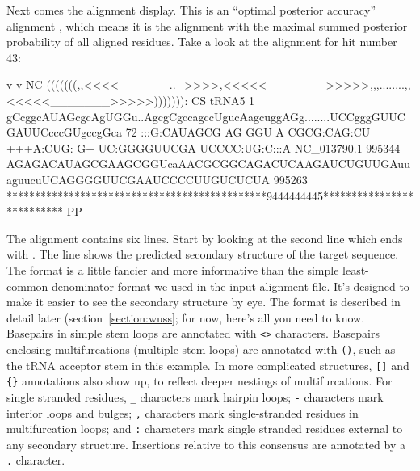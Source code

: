 Next comes the alignment display. This is an ``optimal
posterior accuracy'' alignment \cite{Holmes98}, which means it is the
alignment with the maximal summed posterior probability of all
aligned residues. Take a look at the alignment for hit number 43:

\begin{sreoutput}

                                 v         v                                                            NC
                     (((((((,,<<<<______.._>>>>,<<<<<_______>>>>>,,,........,,<<<<<_______>>>>>))))))): CS
        tRNA5      1 gCcggcAUAGcgcAgUGGu..AgcgCgccagccUgucAagcuggAGg........UCCgggGUUCGAUUCcccGUgccgGca 72    
                     :::G:CAUAGCG AG GGU  A CGCG:CAG:CU +++A:CUG: G+        UC:GGGGUUCGA UCCCC:UG:C:::A
  NC_013790.1 995344 AGAGACAUAGCGAAGCGGUcaAACGCGGCAGACUCAAGAUCUGUUGAuuaguucuUCAGGGGUUCGAAUCCCCUUGUCUCUA 995263
                     **********************************************9444444445************************** PP
\end{sreoutput}

The alignment contains six lines. Start by looking at the second line
which ends with .  The line shows the predicted secondary
structure of the target sequence. The format is a little fancier and
more informative than the simple least-common-denominator format we
used in the input alignment file. It's designed to make it easier to
see the secondary structure by eye. The format is described in detail
later (section~\ref{section:wuss}; for now, here's all you need to
know. Basepairs in simple stem loops are annotated with \verb+<>+
characters. Basepairs enclosing multifurcations (multiple stem loops)
are annotated with \verb+()+, such as the tRNA acceptor stem in this
example. In more complicated structures, \verb+[]+ and \verb+{}+
annotations also show up, to reflect deeper nestings of
multifurcations. For single stranded residues, \verb+_+ characters
mark hairpin loops; \verb+-+ characters mark interior loops and
bulges; \verb+,+ characters mark single-stranded residues in
multifurcation loops; and \verb+:+ characters mark single stranded
residues external to any secondary structure. Insertions relative to
this consensus are annotated by a \verb+.+ character.

